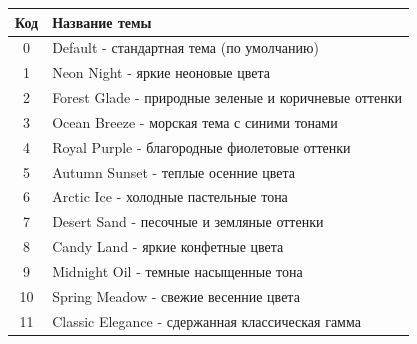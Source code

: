 \documentclass[a4paper,12pt]{article}
\begin{document}
\begin{center}
\begin{tabular}{|c|l|}
\hline
\textbf{Код} & \textbf{Название темы} \\ \hline
    0 & Default - стандартная тема (по умолчанию) \\
    1 & Neon Night - яркие неоновые цвета \\
    2 & Forest Glade - природные зеленые и коричневые оттенки \\
    3 & Ocean Breeze - морская тема с синими тонами \\
    4 & Royal Purple - благородные фиолетовые оттенки \\
    5 & Autumn Sunset - теплые осенние цвета \\
    6 & Arctic Ice - холодные пастельные тона \\
    7 & Desert Sand - песочные и земляные оттенки \\
    8 & Candy Land - яркие конфетные цвета \\
    9 & Midnight Oil - темные насыщенные тона \\
    10 & Spring Meadow - свежие весенние цвета \\
    11 & Classic Elegance - сдержанная классическая гамма \\
\hline
\end{tabular}
\end{center}
\end{document}
